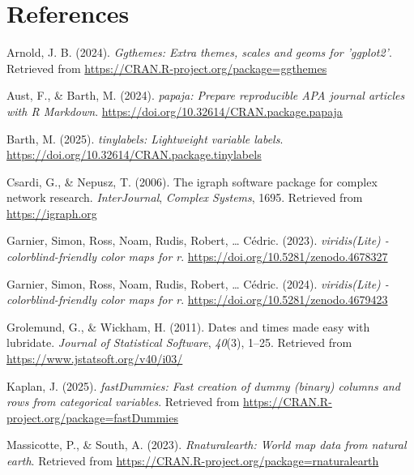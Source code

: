 \documentclass[
  man,floatsintext]{apa6}
\newlength{\cslhangindent}
\newenvironment{CSLReferences}[2] %
 {\begin{list}{}{%
  \setlength{\itemindent}{0pt}
  \setlength{\leftmargin}{0pt}
  \setlength{\parsep}{0pt}
  \ifodd #1
   \setlength{\leftmargin}{\cslhangindent}
   \setlength{\itemindent}{-1\cslhangindent}
  \fi
  \setlength{\itemsep}{#2\baselineskip}}}
 {\end{list}}
\begin{document}
\newpage

\section{References}\label{references}

\label{refs}
\begin{CSLReferences}{1}{0}
Arnold, J. B. (2024). \emph{Ggthemes: Extra themes, scales and geoms for 'ggplot2'}. Retrieved from \url{https://CRAN.R-project.org/package=ggthemes}

Aust, F., \& Barth, M. (2024). \emph{{papaja}: {Prepare} reproducible {APA} journal articles with {R Markdown}}. \url{https://doi.org/10.32614/CRAN.package.papaja}

Barth, M. (2025). \emph{{tinylabels}: Lightweight variable labels}. \url{https://doi.org/10.32614/CRAN.package.tinylabels}

Csardi, G., \& Nepusz, T. (2006). The igraph software package for complex network research. \emph{InterJournal}, \emph{Complex Systems}, 1695. Retrieved from \url{https://igraph.org}

Garnier, Simon, Ross, Noam, Rudis, Robert, \ldots{} Cédric. (2023). \emph{{viridis(Lite)} - colorblind-friendly color maps for r}. \url{https://doi.org/10.5281/zenodo.4678327}

Garnier, Simon, Ross, Noam, Rudis, Robert, \ldots{} Cédric. (2024). \emph{{viridis(Lite)} - colorblind-friendly color maps for r}. \url{https://doi.org/10.5281/zenodo.4679423}

Grolemund, G., \& Wickham, H. (2011). Dates and times made easy with {lubridate}. \emph{Journal of Statistical Software}, \emph{40}(3), 1--25. Retrieved from \url{https://www.jstatsoft.org/v40/i03/}

Kaplan, J. (2025). \emph{fastDummies: Fast creation of dummy (binary) columns and rows from categorical variables}. Retrieved from \url{https://CRAN.R-project.org/package=fastDummies}

Massicotte, P., \& South, A. (2023). \emph{Rnaturalearth: World map data from natural earth}. Retrieved from \url{https://CRAN.R-project.org/package=rnaturalearth}


\end{CSLReferences}
\end{document}
